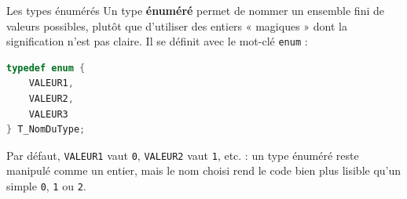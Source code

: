 
\begin{UPSTIinfor}{Les types énumérés}
    Un type \textbf{énuméré} permet de nommer un ensemble fini de valeurs possibles, plutôt que
    d'utiliser des entiers « magiques » dont la signification n'est pas claire. Il se définit avec
    le mot-clé \texttt{enum} :
    \begin{lstlisting}[language=C]
typedef enum {
    VALEUR1,
    VALEUR2,
    VALEUR3
} T_NomDuType;
\end{lstlisting}
    Par défaut, \texttt{VALEUR1} vaut \texttt{0}, \texttt{VALEUR2} vaut \texttt{1}, etc. : un type énuméré
    reste manipulé comme un entier, mais le nom choisi rend le code bien plus lisible qu'un simple
    \texttt{0}, \texttt{1} ou \texttt{2}.
\end{UPSTIinfor}

